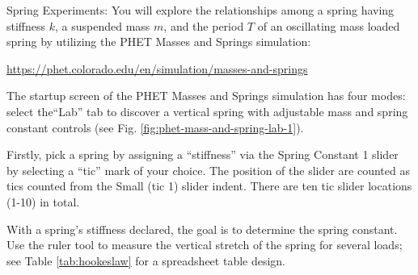\documentclass[14pt]{article}
\newcommand{\subheading}[1]{{\boldtenrm #1}}
\begin{document}
\newpage 
\vphantom{}

\subheading{Spring Experiments:} You will explore the relationships among a spring having stiffness $k$, a suspended mass $m$, and the period $T$ of an oscillating mass loaded spring by utilizing the PHET Masses and Springs simulation: 
\vskip 0pt
\centerline{\url{https://phet.colorado.edu/en/simulation/masses-and-springs}}

\vskip -5pt
\begin{figure}
    \centering
    \label{fig:labicon}
\end{figure}


The startup screen of the PHET Masses and Springs simulation has four modes: select the``Lab'' tab to discover a vertical spring with adjustable mass and spring constant controls (see Fig. \ref{fig:phet-mass-and-spring-lab-1}). %

Firstly, pick a spring by assigning a ``stiffness'' via the Spring Constant 1 slider by selecting a ``tic'' mark of your choice.  The position of the slider are counted as tics counted from the Small (tic 1) slider indent. There are ten tic slider locations (1-10) in total. 

With a spring's stiffness declared, the goal is to determine the spring constant. Use the ruler tool to measure the vertical stretch of the spring for several loads; see Table \ref{tab:hookeslaw} for a spreadsheet table design. 

\end{document}
